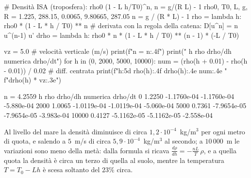 \begin{python}
# Densità ISA (troposfera): rho0 (1 - L h/T0)^n, n = g/(R L) - 1
rho0, T0, L, g, R = 1.225, 288.15, 0.0065, 9.80665, 287.05
n = g / (R * L) - 1
rho = lambda h: rho0 * (1 - L * h / T0) ** n
# derivata con la regola della catena: D[u^n] = n u^(n-1) u'
drho = lambda h: rho0 * n * (1 - L * h / T0) ** (n - 1) * (-L / T0)

vz = 5.0                               # velocità verticale (m/s)
print(f"n = {n:.4f}")
print("    h      rho      drho/dh     numerica     drho/dt")
for h in (0, 2000, 5000, 10000):
    num = (rho(h + 0.01) - rho(h - 0.01)) / 0.02  # diff. centrata
    print(f"{h:5d}   {rho(h):.4f}  {drho(h):.4e}  {num:.4e}  "
          f"{drho(h) * vz:.3e}")
\end{python}
\begin{risultato}
n = 4.2559
    h      rho      drho/dh     numerica     drho/dt
    0   1.2250  -1.1760e-04  -1.1760e-04  -5.880e-04
 2000   1.0065  -1.0119e-04  -1.0119e-04  -5.060e-04
 5000   0.7361  -7.9654e-05  -7.9654e-05  -3.983e-04
10000   0.4127  -5.1162e-05  -5.1162e-05  -2.558e-04
\end{risultato}

Al livello del mare la densità diminuisce di circa $1{,}2\cdot10^{-4}$~kg/m$^{3}$ per
ogni metro di quota, e salendo a $5$~m/s di circa $5{,}9\cdot10^{-4}$~kg/m$^{3}$ al
secondo; a $10\,000$~m le variazioni sono meno della metà: dalla formula si ricava
$\frac{d\rho}{dh}=-\frac{nL}{T}\,\rho$, e a quella quota la densità è circa un terzo di quella
al suolo, mentre la temperatura $T=T_{0}-Lh$ è scesa soltanto del $23\%$ circa.
